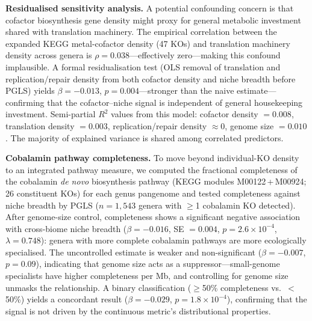 \documentclass[times]{zHenriquesLab-StyleBioRxiv}
\begin{document}
\textbf{Residualised sensitivity analysis.} A potential
confounding concern is that cofactor biosynthesis gene density might proxy for
general metabolic investment shared with translation machinery. The empirical
correlation between the expanded KEGG metal-cofactor density (47 KOs) and
translation machinery density across genera is $\rho = 0.038$---effectively
zero---making this confound implausible. A formal residualisation test (OLS
removal of translation and replication/repair density from both cofactor density
and niche breadth before PGLS) yields $\beta = -0.013$, $p = 0.004$---stronger
than the naive estimate---confirming that the cofactor--niche signal is
independent of general housekeeping investment. Semi-partial $R^2$ values from
this model: cofactor density $= 0.008$, translation density $= 0.003$,
replication/repair density $\approx 0$, genome size $= 0.010$. The majority of
explained variance is shared among correlated predictors.

\textbf{Cobalamin pathway completeness.} To move beyond individual-KO
density to an integrated pathway measure, we computed the fractional
completeness of the cobalamin \textit{de novo} biosynthesis pathway (KEGG
modules M00122\,+\,M00924; 26 constituent KOs) for each genus pangenome
and tested completeness against niche breadth by PGLS ($n = 1{,}543$
genera with $\geq$1 cobalamin KO detected). After genome-size control,
completeness shows a significant negative association with cross-biome
niche breadth ($\beta = -0.016$, SE $= 0.004$, $p = 2.6 \times 10^{-4}$,
$\lambda = 0.748$): genera with more complete cobalamin pathways are more
ecologically specialised. The uncontrolled estimate is weaker and
non-significant ($\beta = -0.007$, $p = 0.09$), indicating that genome
size acts as a suppressor---small-genome specialists have higher
completeness per Mb, and controlling for genome size unmasks the
relationship. A binary classification ($\geq$50\% completeness vs.\
$<$50\%) yields a concordant result ($\beta = -0.029$, $p = 1.8 \times
10^{-4}$), confirming that the signal is not driven by the continuous
metric's distributional properties.
\end{document}
